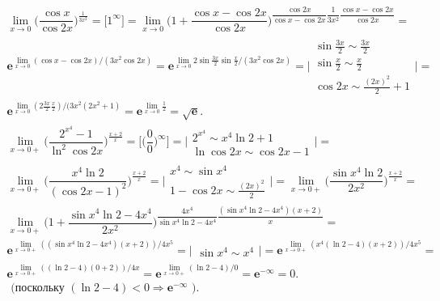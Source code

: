 \documentclass[12pt]{article}
\begin{document}
$$
\begin{array}{l}
\lim\limits_{x\rightarrow 0}\biggl(\dfrac{\cos{x}}{\cos{2x}}\biggr)^\frac{1}{3x^2} = 
\biggr[1^{\infty}\biggl] = 
\lim\limits_{x\rightarrow 0}\biggl(1+\dfrac{\cos{x}-\cos{2x}}{\cos{2x}}\biggr)^{\dfrac{\cos{2x}}{\cos{x}-\cos{2x}}\dfrac{1}{3x^2}\dfrac{\cos{x}-\cos{2x}}{\cos{2x}}} = \\
\mathbf{e}^{\lim\limits_{x\rightarrow 0}{(\cos{x}-\cos{2x})/(3x^2\cos{2x})}} = 
\mathbf{e}^{\lim\limits_{x\rightarrow 0}{2\sin{\frac{3x}{2}}\sin{\frac{x}{2}}}/(3x^2\cos{2x})} = 
\biggl|
\begin{array}{l}
\sin{\frac{3x}{2}} \sim \frac{3x}{2} \\
\sin{\frac{x}{2}} \sim \frac{x}{2} \\
\cos{2x} \sim \frac{(2x)^2}{2}+1
\end{array}
\biggr| = \\
\mathbf{e}^{\lim\limits_{x\rightarrow 0}{(2\frac{3x}{2}\frac{x}{2})/(3x^2(2x^2+1)}} = 
\mathbf{e}^{\lim\limits_{x\rightarrow 0}{\frac{1}{2}}} =
\sqrt{\mathbf{e}}.
\end{array}
$$
$$
\begin{array}{l}
\lim\limits_{x\rightarrow 0+}\biggl(\dfrac{2^{x^{4}}-1}{\ln^2{\cos{2x}}}\biggr)^{\frac{x+2}{x}} = 
\biggr[\biggr(\dfrac{0}{0}\biggl)^{\infty}\biggl] = 
\biggl|
\begin{array}{l}
2^{x^{4}} \sim x^4\ln2+1\\
\ln{\cos{2x}} \sim \cos{2x}-1
\end{array}
\biggr| = \\
\lim\limits_{x\rightarrow 0+}\biggl(\dfrac{x^4\ln2}{(\cos{2x}-1)^2}\biggr)^{\frac{x+2}{x}} = 
\biggl|
\begin{array}{l}
x^4 \sim \sin{x^4} \\
1-\cos{2x} \sim \frac{(2x)^2}{2}
\end{array}
\biggr| = 
\lim\limits_{x\rightarrow 0+}\biggl(\dfrac{\sin{x^4}\ln2}{2x^2}\biggr)^{\frac{x+2}{x}} = \\
\lim\limits_{x\rightarrow 0+}\biggl(1+\dfrac{\sin{x^4}\ln2-4x^4}{2x^2}\biggr)^{\dfrac{4x^4}{\sin{x^4}\ln2-4x^4}\dfrac{(\sin{x^4}\ln2-4x^4)(x+2)}{x}} = \\
\mathbf{e}^{\lim\limits_{x\rightarrow 0+}{((\sin{x^4}\ln2-4x^4)(x+2))/4x^5}} =
\biggl|
\begin{array}{l}
\sin{x^4} \sim x^4
\end{array}
\biggr| = 
\mathbf{e}^{\lim\limits_{x\rightarrow 0+}{(x^4(\ln2-4)(x+2))/4x^5}} = \\
\mathbf{e}^{\lim\limits_{x\rightarrow 0+}{((\ln2-4)(0+2))/4x}} =
\mathbf{e}^{\lim\limits_{x\rightarrow 0+}{(\ln2-4)/0}} =
\mathbf{e}^{-\infty} = 0. \\ 
\text{   (поскольку  } (\ln2-4)<0 \Rightarrow \mathbf{e}^{-\infty} \text{ ).}
\end{array}
$$
\end{document}
